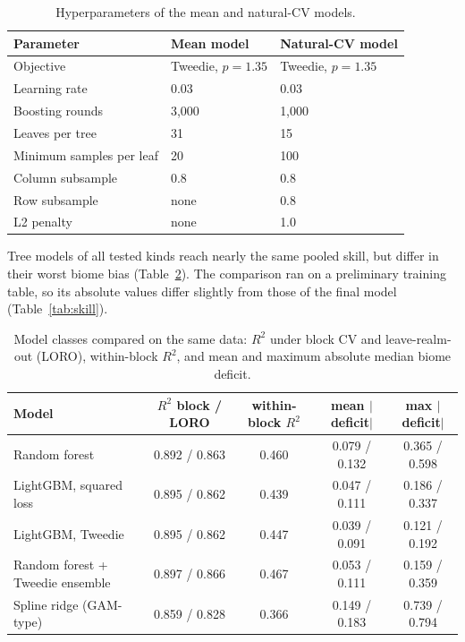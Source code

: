 \documentclass[11pt,a4paper]{article}
\begin{document}
\begin{table}[H]
\centering\small
\caption{Hyperparameters of the mean and natural-CV models.}
\label{tab:hyper}
\begin{tabular}{lll}
\toprule
Parameter & Mean model & Natural-CV model \\
\midrule
Objective & Tweedie, $p = 1.35$ & Tweedie, $p = 1.35$ \\
Learning rate & 0.03 & 0.03 \\
Boosting rounds & 3,000 & 1,000 \\
Leaves per tree & 31 & 15 \\
Minimum samples per leaf & 20 & 100 \\
Column subsample & 0.8 & 0.8 \\
Row subsample & none & 0.8 \\
L2 penalty & none & 1.0 \\
\bottomrule
\end{tabular}
\end{table}

Tree models of all tested kinds reach nearly the same pooled skill, but differ in their worst
biome bias (Table~\ref{tab:classes}). The comparison ran on a preliminary training table, so
its absolute values differ slightly from those of the final model (Table~\ref{tab:skill}).

\begin{table}[H]
\centering\small
\caption{Model classes compared on the same data: $R^2$ under block CV and leave-realm-out
(LORO), within-block $R^2$, and mean and maximum absolute median biome deficit.}
\label{tab:classes}
\setlength{\tabcolsep}{4pt}
\begin{tabular}{lcccc}
\toprule
Model & $R^2$ block / LORO & within-block $R^2$ & mean $|$deficit$|$ & max $|$deficit$|$ \\
\midrule
Random forest & 0.892 / 0.863 & 0.460 & 0.079 / 0.132 & 0.365 / 0.598 \\
LightGBM, squared loss & 0.895 / 0.862 & 0.439 & 0.047 / 0.111 & 0.186 / 0.337 \\
LightGBM, Tweedie & 0.895 / 0.862 & 0.447 & 0.039 / 0.091 & 0.121 / 0.192 \\
Random forest + Tweedie ensemble & 0.897 / 0.866 & 0.467 & 0.053 / 0.111 & 0.159 / 0.359 \\
Spline ridge (GAM-type) & 0.859 / 0.828 & 0.366 & 0.149 / 0.183 & 0.739 / 0.794 \\
\bottomrule
\end{tabular}
\end{table}
\end{document}
